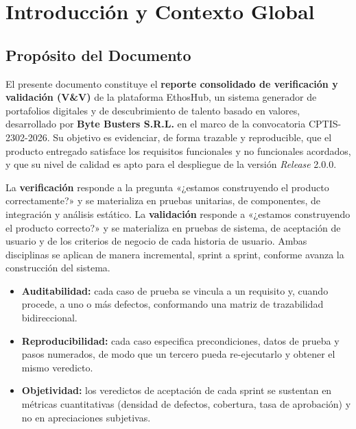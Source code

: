 \chapter{Introducción y Contexto Global}
\label{ch:introduccion}

\section{Propósito del Documento}
\label{sec:proposito}

El presente documento constituye el \textbf{reporte consolidado de verificación y
validación (V\&V)} de la plataforma EthosHub, un sistema generador de portafolios
digitales y de descubrimiento de talento basado en valores, desarrollado por
\textbf{Byte Busters S.R.L.} en el marco de la convocatoria CPTIS-2302-2026. Su objetivo
es evidenciar, de forma trazable y reproducible, que el producto entregado satisface los
requisitos funcionales y no funcionales acordados, y que su nivel de calidad es apto para
el despliegue de la versión \textit{Release} 2.0.0.

La \textbf{verificación} responde a la pregunta «¿estamos construyendo el producto
correctamente?» y se materializa en pruebas unitarias, de componentes, de integración y
análisis estático. La \textbf{validación} responde a «¿estamos construyendo el producto
correcto?» y se materializa en pruebas de sistema, de aceptación de usuario y de los
criterios de negocio de cada historia de usuario. Ambas disciplinas se aplican de manera
incremental, sprint a sprint, conforme avanza la construcción del sistema.

\begin{itemize}
    \item \textbf{Auditabilidad:} cada caso de prueba se vincula a un requisito y, cuando
    procede, a uno o más defectos, conformando una matriz de trazabilidad bidireccional.
    \item \textbf{Reproducibilidad:} cada caso especifica precondiciones, datos de prueba
    y pasos numerados, de modo que un tercero pueda re-ejecutarlo y obtener el mismo
    veredicto.
    \item \textbf{Objetividad:} los veredictos de aceptación de cada sprint se sustentan
    en métricas cuantitativas (densidad de defectos, cobertura, tasa de aprobación) y no
    en apreciaciones subjetivas.
\end{itemize}

